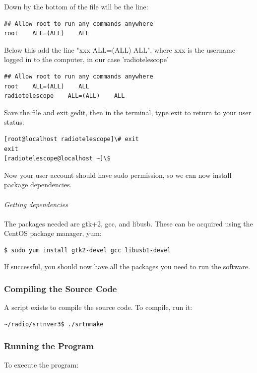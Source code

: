 \documentclass[11pt]{article} %
\begin{document}
Down by the bottom of the file will be the line:

\begin{lstlisting}[frame=single]
## Allow root to run any commands anywhere
root    ALL=(ALL)    ALL
\end{lstlisting}

Below this add the line "xxx ALL=(ALL) ALL", where xxx is the username logged in to the computer, in our case 'radiotelescope'

\begin{lstlisting}[frame=single]
## Allow root to run any commands anywhere
root    ALL=(ALL)    ALL
radiotelescope    ALL=(ALL)    ALL
\end{lstlisting}

Save the file and exit gedit, then in the terminal, type exit to return to your user status:

\begin{lstlisting}[frame=single]
[root@localhost radiotelescope]\# exit
exit
[radiotelescope@localhost ~]\$
\end{lstlisting}

Now your user account should have sudo permission, so we can now install package dependencies.
\\ \\
\emph{Getting dependencies}
\\ \\
The packages needed are gtk+2, gcc, and libusb. These can be acquired using the CentOS package manager, yum:

\begin{lstlisting}[frame=single]
$ sudo yum install gtk2-devel gcc libusb1-devel
\end{lstlisting}

\noindent If successful, you should now have all the packages you need to run the software.

\vspace{1cm}
\subsubsection{Compiling the Source Code}
 A script exists to compile the source code. To compile, run it:

\begin{lstlisting}[frame=single]
~/radio/srtnver3$ ./srtnmake
\end{lstlisting}

\vspace{1cm}
\subsubsection{Running the Program}
To execute the program:
\end{document}
